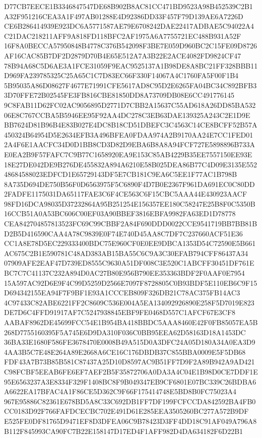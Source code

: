 \documentclass[UTF8,fontset=fandol,zihao=-4,a4paper]{ctexart}
\begin{document}
{{D77CB7EECE1B3346847547DE68B902B8AC81CC471BD9523A98B452539C2B1A32F951216CEA3A1F497AB01288E4D92386DD33F457F79D139AE6A7226D
CE6B286414939E923DC6A5771587AE79E6708242DAE22417ADBAE5C94022A4C21DAC218211AFF9A818FD118BFC2AF1975A6A7755721EC488B931A52F
16F8A0BECCA57950848B4778C376B542098F3BE7E059D960BC2C15FE09D8726AF16CAC85B7DF2D2879D70B4E65E512A7A3B22E2ACE4082FD9824CF47
78B94A68C5D6AE3A1FCE31059F9EAC9525137A1B98DE8A8BC21FF328BBB11D969FA239785325C25A65C1C7D83EC66F330F14067A4C1760FA5F00F1B4
5B95035A86D08627F4677E71991CFE5617AD8C95D2E6265FA04BC34C892BFB33D70FFE72B02545FE3FB816CBE81850DD8A73709DB08E6CC491776145
9C8FAB11D62FC02AC9056895D2771D7CBB2A15637C55AD618A26DD85BA53206E8C767CCBA5B5946EE95F92AA4DC278C3EB63DAE139325A243C2E1D9E
BB7624D81B96B4E83B027E4DC8B18CD51DBEFC3C4563C14CE8BCFF52B57A450324B64954D5E2634EFB3A496BFEA0FDAA974A2B9170AA24E7CC1FED01
2A4F6E1AACFC34D0D1BB8CD3D82D9EBA6B8A8A94FCF727E5898896B733AE0EA2B9F57FAFC7C9B77C1658920EA9E153C85AB4229B35EE7557150EE93E
18E27DE042DE9B276DE455832A894A6210E58B025DEA86B77C4D09E3135E55248684588023EDFCD1E65729143DF5E7CB181C9EA6C5EE1F77AC1B798B
8A735D694DE750B56F0D6563975F5C6890F4D7B0E2367F961DA691EC0C80DD2FADFE1175031DA65117FAE3C6F4CE563C6F15CBC5AAA44E430923AACF
98FD16DCA98035D37232864A95B251254E156357EE180C58247E25B8F0C5350B16CCB51A0A53BC606C00EF03A90BBEF3816EBFA9982FA63ED1D78778
CEA842704857813523FC69C99CBBF2A84F690DDD0022CCE9541719BB7BB81BD2B5D416590CAA4A78C9839E0F74E740D45AA8C7DF7C237660ACF51E36
CC1A8E78D5EC229333400BDC75E960CF0E0EE9DBCA1353D54C72590E5B661AC675C2B1E590781C48AD383AB15BA55C6C9A3C30EFAB794CFF86437A34
07909AFE2EAF47D739ED8555C9630A51DF008C3E520C1ABCFF30451DF761EBC7C7C41137C232A894D0AC27B80E956B790EE353363BDF2F0AAF0E7954
15A597AC92D6E9F4C99D5259D2566E7097F8728805C0B93BDF5E110EB6C9F15D694342155EA94F7F9BF1E93A1CCCEB809F326DB21C78AC375FB14AC3
4C97433C82ABE6221FF2C8609C536E004A5EA134092926890E258F5D7019E823DE7D6C4FFD91917AF7C5247938845EBF9FE0468D557C1AFCF67E3CF8
AABAF8962DE45699FCC54E1B954BA418BBDC5AAA8460E42F0FB85057EA5B268D7755160395F5A745E6D9DA310F036C0BB95EEA62D58163D18A1453DC
36BA33E1680F586FE3678470E0008B49A515D0A3DFC24A05D180A34A0EA3D94AA3B5C7E48E264A89E2668A6CE16C176DBDB37C855BBA0009E5F5DB68
FDF43A7B73B85B581C87437A25D10D8597AC9B51FF7D9F2A89B942A9AD421C98FCBF5EEAB6FE6EF7AEF2B5F35872706A0DA3A4C04E1B98D0CE7DDF1E
95E6563237A3E8334F329F1408BC8F9B049347EB9CF6801E07BC339C26BDBA6A6622EA17BFAC4A1F86CE5D362C9F66F175414748E5BD8B0FC75023A4
967E95886C82361E678BD5A8C33C692DB1FF7DF199FCFCCDA842592BA4FB0CC0183D92F766FAFDCECBC702E491D61E285EEA3505260BC277A572B9DF
E525FE0DF81765D9471EF8D3DFEA06C9B78423D3FF4DD18C91AF049A796A8B112F845993CA90FC7B22E158147D17ED4F1AFF982D4DA634182F6D22B1
}}
\end{document}

